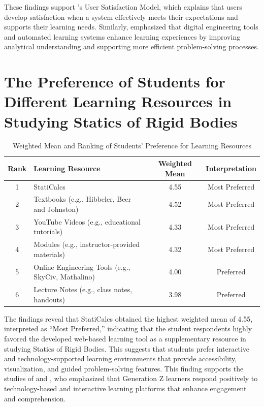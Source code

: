 These findings support \cite{johnson_customer_2001}’s User Satisfaction Model, which explains that users develop satisfaction when a system effectively meets their expectations and supports their learning needs. Similarly, \cite{gfrerer_teaching_2023} emphasized that digital engineering tools and automated learning systems enhance learning experiences by improving analytical understanding and supporting more efficient problem-solving processes.
\section{The Preference of Students for Different Learning Resources in Studying Statics of Rigid Bodies}

\begin{table}[H]
\vspace{-1cm}
\centering
\caption{Weighted Mean and Ranking of Students’ Preference for Learning Resources}
\renewcommand{\arraystretch}{1.3}
\begin{tabular}{c p{5.5cm} c c}
\hline
\textbf{Rank} & \textbf{Learning Resource} & \textbf{Weighted Mean} & \textbf{Interpretation} \\
\hline
1 & StatiCalcs & 4.55 & Most Preferred \\
2 & Textbooks (e.g., Hibbeler, Beer and Johnston) & 4.52 & Most Preferred \\
3 & YouTube Videos (e.g., educational tutorials) & 4.33 & Most Preferred \\
4 & Modules (e.g., instructor-provided materials) & 4.32 & Most Preferred \\
5 & Online Engineering Tools (e.g., SkyCiv, Mathalino) & 4.00 & Preferred \\
6 & Lecture Notes (e.g., class notes, handouts) & 3.98 & Preferred \\
\hline
\end{tabular}
\end{table}

The findings reveal that StatiCalcs obtained the highest weighted mean of 4.55, interpreted as ``Most Preferred,'' indicating that the student respondents highly favored the developed web-based learning tool as a supplementary resource in studying Statics of Rigid Bodies. This suggests that students prefer interactive and technology-supported learning environments that provide accessibility, visualization, and guided problem-solving features. This finding supports the studies of \cite{szymkowiak_information_2021} and \cite{tawafak_innovative_2021}, who emphasized that Generation Z learners respond positively to technology-based and interactive learning platforms that enhance engagement and comprehension.

